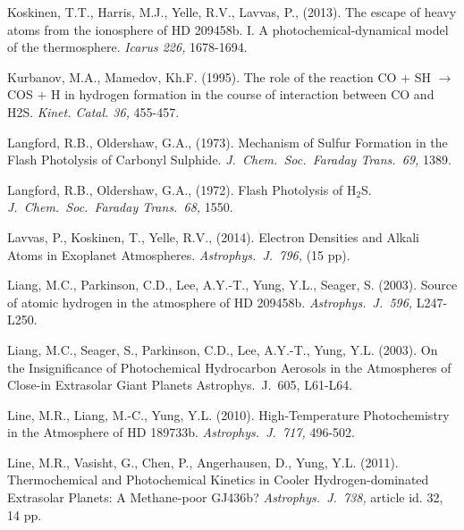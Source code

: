 \documentclass[preprint]{aastex6}
\newcounter{reaction}
\begin{document}
\begin{thebibliography}{00}
Koskinen, T.T., Harris, M.J., Yelle, R.V., Lavvas, P., (2013).
The escape of heavy atoms from the ionosphere of HD 209458b. I. A photochemical-dynamical model of the thermosphere.
{\em Icarus 226,} 1678-1694.

Kurbanov, M.A., Mamedov, Kh.F.  (1995). The role of the reaction CO + SH $\rightarrow$ COS + H in hydrogen formation in the course of interaction between CO and H2S.  {\em Kinet. Catal.  36,} 455-457.

Langford, R.B., Oldershaw, G.A., (1973).
Mechanism of Sulfur Formation in the Flash Photolysis of Carbonyl Sulphide.
{\em J.\ Chem.\ Soc.\ Faraday Trans.\ 69,} 1389.

Langford, R.B., Oldershaw, G.A., (1972).
Flash Photolysis of H$_2$S.
{\em J.\ Chem.\ Soc.\ Faraday Trans.\ 68,} 1550.

Lavvas, P., Koskinen, T., Yelle, R.V., (2014).
Electron Densities and Alkali Atoms in Exoplanet Atmospheres.
{\em Astrophys.\ J.\ 796,} (15 pp).


Liang, M.C., Parkinson, C.D., Lee, A.Y.-T., Yung, Y.L., Seager, S. (2003).
Source of atomic hydrogen in the atmosphere of HD 209458b.
{\em Astrophys.\ J.\ 596,} L247-L250.

Liang, M.C., Seager, S., Parkinson, C.D., Lee, A.Y.-T., Yung, Y.L. (2003).
On the Insignificance of Photochemical Hydrocarbon Aerosols in the Atmospheres of Close-in Extrasolar Giant Planets
Astrophys.\ J.\ 605, L61-L64.

 Line, M.R., Liang, M.-C., Yung, Y.L. (2010). 
 High-Temperature Photochemistry in the Atmosphere of HD 189733b.
  {\em Astrophys.\ J.\ 717,} 496-502.

Line, M.R., Vasisht, G., Chen, P., Angerhausen, D., Yung, Y.L. (2011).
Thermochemical and Photochemical Kinetics in Cooler Hydrogen-dominated Extrasolar Planets: A Methane-poor GJ436b? 
{\em  Astrophys.\ J.\ 738,} article id. 32, 14 pp.


\end{thebibliography}
\end{document}
